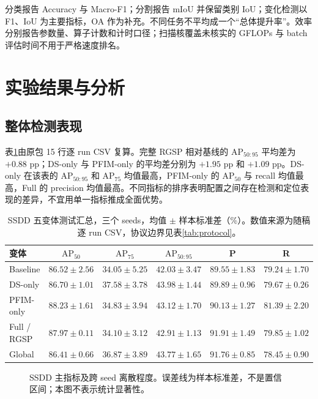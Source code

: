 \documentclass[UTF8,11pt,a4paper,fontset=fandol]{ctexart}
\newcommand{\ap}{\mathrm{AP}}
\begin{document}
分类报告 Accuracy 与 Macro-F1；分割报告 mIoU 并保留类别 IoU；变化检测以 F1、IoU 为主要指标，OA 作为补充。不同任务不平均成一个“总体提升率”。效率分别报告参数量、算子计数和计时口径；扫描核覆盖未核实的 GFLOPs 与 batch 评估时间不用于严格速度排名。
\FloatBarrier

\section{实验结果与分析}\label{sec:results}
\subsection{整体检测表现}
表\ref{tab:ssdd}由原包 15 行逐 run CSV 复算。完整 RGSP 相对基线的 $\ap_{50:95}$ 平均差为 $+0.88$ pp；DS-only 与 PFIM-only 的平均差分别为 $+1.95$ pp 和 $+1.09$ pp。DS-only 在该表的 $\ap_{50:95}$ 和 $\ap_{75}$ 均值最高，PFIM-only 的 $\ap_{50}$ 与 recall 均值最高，Full 的 precision 均值最高。不同指标的排序表明配置之间存在检测和定位表现的差异，不宜用单一指标推成全面优势。

\begin{table}[!htbp]\centering\small
\caption{SSDD 五变体测试汇总，三个 seeds，均值 $\pm$ 样本标准差（\%）。数值来源为随稿逐 run CSV，协议边界见表\ref{tab:protocol}。}
\label{tab:ssdd}
\setlength{\tabcolsep}{4pt}
\begin{tabular}{lccccc}
\toprule
变体 & $\ap_{50}$ & $\ap_{75}$ & $\ap_{50:95}$ & P & R\\
\midrule
Baseline & $86.52\pm2.56$ & $34.05\pm5.25$ & $42.03\pm3.47$ & $89.55\pm1.83$ & $79.24\pm1.70$\\
DS-only & $86.70\pm1.01$ & $37.58\pm3.78$ & $43.98\pm1.44$ & $89.89\pm0.96$ & $79.67\pm0.26$\\
PFIM-only & $88.23\pm1.61$ & $34.83\pm3.94$ & $43.12\pm1.70$ & $90.13\pm1.27$ & $81.39\pm2.20$\\
Full / RGSP & $87.97\pm0.11$ & $34.10\pm3.12$ & $42.91\pm1.13$ & $91.91\pm1.49$ & $79.85\pm1.02$\\
Global & $86.41\pm0.66$ & $36.87\pm3.89$ & $43.77\pm1.65$ & $91.76\pm0.85$ & $78.45\pm0.90$\\
\bottomrule
\end{tabular}
\end{table}

\begin{figure}[tbp]\centering
{}
\caption{SSDD 主指标及跨 seed 离散程度。误差线为样本标准差，不是置信区间；本图不表示统计显著性。}
\label{fig:ssdd}
\end{figure}
\end{document}
